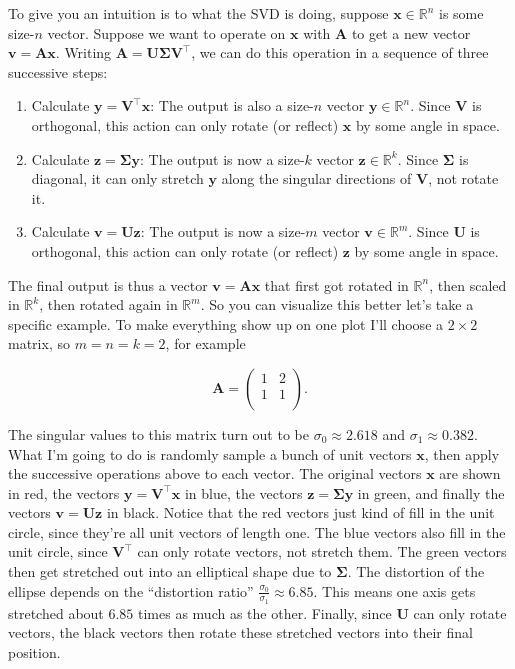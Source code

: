 \documentclass[
  letterpaper,
  DIV=11,
  numbers=noendperiod]{scrreprt}
\providecommand{\tightlist}{%
  \setlength{\itemsep}{0pt}\setlength{\parskip}{0pt}}\usepackage{longtable,booktabs,array}
\begin{document}
To give you an intuition is to what the SVD is doing, suppose
\(\mathbf{x} \in \mathbb{R}^n\) is some size-\(n\) vector. Suppose we
want to operate on \(\mathbf{x}\) with \(\mathbf{A}\) to get a new
vector \(\mathbf{v} = \mathbf{A}\mathbf{x}\). Writing
\(\mathbf{A} = \mathbf{U} \mathbf{\Sigma} \mathbf{V}^\top\), we can do
this operation in a sequence of three successive steps:

\begin{enumerate}
\def\labelenumi{\arabic{enumi}.}
\tightlist
\item
  Calculate \(\mathbf{y} = \mathbf{V}^\top \mathbf{x}\): The output is
  also a size-\(n\) vector \(\mathbf{y} \in \mathbb{R}^n\). Since
  \(\mathbf{V}\) is orthogonal, this action can only rotate (or reflect)
  \(\mathbf{x}\) by some angle in space.
\item
  Calculate \(\mathbf{z} = \mathbf{\Sigma}\mathbf{y}\): The output is
  now a size-\(k\) vector \(\mathbf{z} \in \mathbb{R}^k\). Since
  \(\mathbf{\Sigma}\) is diagonal, it can only stretch \(\mathbf{y}\)
  along the singular directions of \(\mathbf{V}\), not rotate it.
\item
  Calculate \(\mathbf{v} = \mathbf{U}\mathbf{z}\): The output is now a
  size-\(m\) vector \(\mathbf{v} \in \mathbb{R}^m\). Since
  \(\mathbf{U}\) is orthogonal, this action can only rotate (or reflect)
  \(\mathbf{z}\) by some angle in space.
\end{enumerate}

The final output is thus a vector \(\mathbf{v} = \mathbf{A}\mathbf{x}\)
that first got rotated in \(\mathbb{R}^n\), then scaled in
\(\mathbb{R}^k\), then rotated again in \(\mathbb{R}^m\). So you can
visualize this better let's take a specific example. To make everything
show up on one plot I'll choose a \(2 \times 2\) matrix, so \(m=n=k=2\),
for example

\[
\mathbf{A} = 
\begin{pmatrix}
1 & 2 \\
1 & 1 \\
\end{pmatrix}.
\]

The singular values to this matrix turn out to be
\(\sigma_0 \approx 2.618\) and \(\sigma_1 \approx 0.382\). What I'm
going to do is randomly sample a bunch of unit vectors \(\mathbf{x}\),
then apply the successive operations above to each vector. The original
vectors \(\mathbf{x}\) are shown in red, the vectors
\(\mathbf{y} = \mathbf{V}^\top \mathbf{x}\) in blue, the vectors
\(\mathbf{z} = \mathbf{\Sigma}\mathbf{y}\) in green, and finally the
vectors \(\mathbf{v} = \mathbf{U}\mathbf{z}\) in black. Notice that the
red vectors just kind of fill in the unit circle, since they're all unit
vectors of length one. The blue vectors also fill in the unit circle,
since \(\mathbf{V}^\top\) can only rotate vectors, not stretch them. The
green vectors then get stretched out into an elliptical shape due to
\(\mathbf{\Sigma}\). The distortion of the ellipse depends on the
``distortion ratio'' \(\frac{\sigma_0}{\sigma_1} \approx 6.85\). This
means one axis gets stretched about \(6.85\) times as much as the other.
Finally, since \(\mathbf{U}\) can only rotate vectors, the black vectors
then rotate these stretched vectors into their final position.
\end{document}
